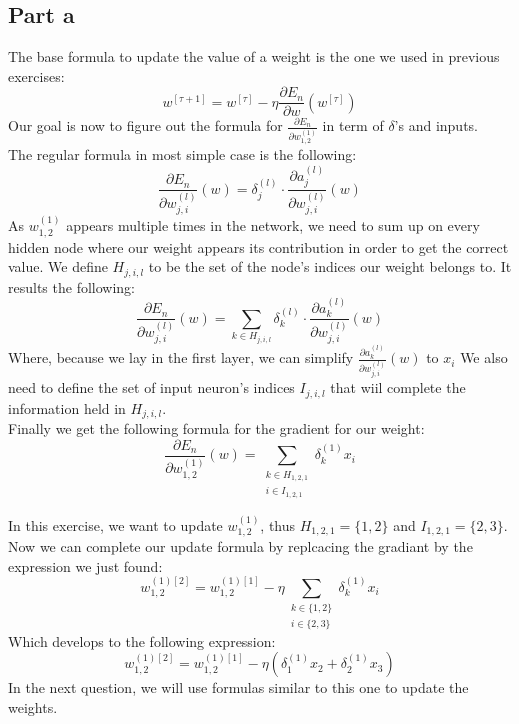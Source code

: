\documentclass[a4paper, 10pt]{article}
\begin{document}
\subsection{Part a}
The base formula to update the value of a weight is the one we used in previous exercises:
$$
w^{[\tau +1]} = w^{[\tau]} - \eta \frac{\partial E_n}{\partial w}(w^{[\tau]})
$$
Our goal is now to figure out the formula for $\frac{\partial E_n}{\partial w_{1,2}^{(1)}}$ in term of $\delta$'s and inputs.
\\
The regular formula in most simple case is the following:
$$
\frac{\partial E_n}{\partial w_{j,i}^{(l)}}(w) = \delta_j^{(l)} \cdot \frac{\partial a_j^{(l)}}{\partial w_{j,i}^{(l)}}(w) 
$$
As $w_{1,2}^{(1)}$ appears multiple times in the network, we need to sum up on every hidden node where our weight appears its contribution in order to get the correct value.
We define $H_{j,i,l}$ to be the set of the node's indices our weight belongs to. It results the following:
$$
\frac{\partial E_n}{\partial w_{j,i}^{(l)}}(w) = \sum_{k\in H_{j,i,l}} \delta_k^{(l)} \cdot \frac{\partial a_k^{(l)}}{\partial w_{j,i}^{(l)}}(w) 
$$
Where, because we lay in the first layer, we can simplify $\frac{\partial a_k^{(l)}}{\partial w_{j,i}^{(l)}}(w)$ to $x_i$
We also need to define the set of input neuron's indices $I_{j,i,l}$ that wiil complete the information held in $H_{j,i,l}$. 
\\
Finally we get the following formula for the gradient for our weight:
$$
\frac{\partial E_n}{\partial w_{1,2}^{(1)}}(w) = \sum_{\substack{k\in H_{1,2,1}\\i\in I_{1,2,1}}} \delta_k^{(1)}x_i 
$$

In this exercise, we want to update $w_{1,2}^{(1)}$, thus $H_{1,2,1} = \{1,2\}$ and $I_{1,2,1} = \{2,3\}$.
Now we can complete our update formula by replcacing the gradiant by the expression we just found:
$$
w_{1,2}^{(1)[2]} = w_{1,2}^{(1)[1]} - \eta \sum_{\substack{k\in\{1,2\}\\i\in\{2,3\}}} \delta_k^{(1)}x_i
$$
Which develops to the following expression:
$$
w_{1,2}^{(1)[2]} = w_{1,2}^{(1)[1]} - \eta (\delta_1^{(1)}x_2 + \delta_2^{(1)}x_3)
$$
In the next question, we will use formulas similar to this one to update the weights.
\end{document}
